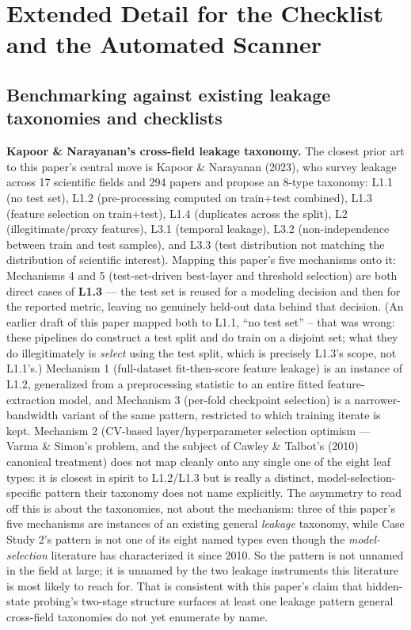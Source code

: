 \documentclass[10pt]{article} %
\begin{document}
\section{Extended Detail for the Checklist and the Automated Scanner}

\subsection{Benchmarking against existing leakage taxonomies and checklists}

\textbf{Kapoor \& Narayanan's cross-field leakage taxonomy.} The closest prior
art to this paper's central move is Kapoor \& Narayanan (2023), who survey
leakage across 17 scientific fields and 294 papers and propose an 8-type
taxonomy: L1.1 (no test set), L1.2 (pre-processing computed on train+test
combined), L1.3 (feature selection on train+test), L1.4 (duplicates across
the split), L2 (illegitimate/proxy features), L3.1 (temporal leakage), L3.2
(non-independence between train and test samples), and L3.3 (test
distribution not matching the distribution of scientific interest). Mapping
this paper's five mechanisms onto it: Mechanisms 4 and 5 (test-set-driven
best-layer and threshold selection) are both direct cases of \textbf{L1.3}
--- the test set is reused for a modeling decision and then for the reported
metric, leaving no genuinely held-out data behind that decision. (An earlier
draft of this paper mapped both to L1.1, ``no test set'' -- that was wrong:
these pipelines do construct a test split and do train on a disjoint set;
what they do illegitimately is \emph{select} using the test split, which is
precisely L1.3's scope, not L1.1's.) Mechanism 1 (full-dataset
fit-then-score feature leakage) is an instance of L1.2, generalized from a
preprocessing statistic to an entire fitted feature-extraction model, and
Mechanism 3 (per-fold checkpoint selection) is a narrower-bandwidth variant
of the same pattern, restricted to which training iterate is kept. Mechanism
2 (CV-based layer/hyperparameter selection optimism --- Varma \& Simon's
problem, and the subject of Cawley \& Talbot's (2010) canonical treatment)
does not map cleanly onto any single one of the eight leaf types:
it is closest in spirit to L1.2/L1.3 but is really a distinct,
model-selection-specific pattern their taxonomy does not name explicitly.
The asymmetry to read off this is about the taxonomies, not about the
mechanism: three of this paper's five mechanisms are instances of an existing
general \emph{leakage} taxonomy, while Case Study 2's pattern is not one of its
eight named types even though the \emph{model-selection} literature has
characterized it since 2010. So the pattern is not unnamed in the field at
large; it is unnamed by the two leakage instruments this literature is most
likely to reach for. That is consistent with this paper's claim that
hidden-state probing's two-stage structure surfaces at least one leakage
pattern general
cross-field taxonomies do not yet enumerate by name.
\end{document}
